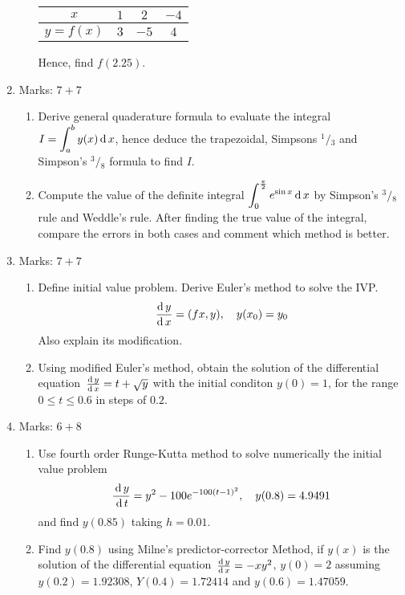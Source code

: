 \documentclass[12pt,class=book,crop=false]{standalone}
\begin{document}
\begin{enumerate}
\begin{enumerate}
\begin{table}[H]
\begin{tabular}{|c|c|c|c|}
                \hline
                $ x $& $ 1 $& $ 2 $& $ -4 $\\\hline               
                $ y=f(x) $ & $ 3 $& $ -5 $& $ 4 $\\\hline
            \end{tabular}
        \end{table}
        Hence, find $ f(2.25) $.
    \end{enumerate}
    \item Marks: $ 7+7 $
    \begin{enumerate}
        \item  Derive general quaderature formula to evaluate the integral $ \displaystyle I=\int_a^b y(x)\,\mathrm{d}\, x $, hence deduce the trapezoidal, Simpsons $ {}^1/{}_3 $ and Simpson's $ {}^3/{}_8 $ formula to find $ I $.
        \item Compute the value of the definite integral $ \displaystyle \int_0^{\frac{\pi}{2}}e^{\sin x}\,\mathrm{d}\, x $ by Simpson's $ {}^3/{}_8 $ rule and Weddle's rule. After finding the true value of the integral, compare the errors in both cases and comment which method is better. 
    \end{enumerate}
    \item Marks: $ 7+7 $
    \begin{enumerate}
        \item Define initial value problem. Derive Euler's method to solve the IVP.
        \[
            \,\frac{\mathrm{d}\,y}{\mathrm{d}\,x}= (fx, y),\quad y(x_0) =y_0
        \]
        Also explain its modification.
        \item Using modified Euler's method, obtain the solution of the differential equation $ \,\frac{\mathrm{d}\,y}{\mathrm{d}\,x}=t+\sqrt{y} $ with the initial conditon $ y (0) = 1 $, for the range $ 0\leq t\leq 0.6 $ in steps of $ 0.2 $.
    \end{enumerate}
    \item Marks: $ 6+8 $
    \begin{enumerate}
        \item Use fourth order Runge-Kutta method to solve numerically the initial value problem
        \[
            \frac{\,\mathrm{d}\, y}{\,\mathrm{d}\, t}=y^2-100e^{-100(t-1)^2},\quad y(0.8)=4.9491
        \]
        and find $ y(0.85) $ taking $ h = 0.01 $.
        \item Find $ y(0.8) $ using Milne's predictor-corrector Method, if $ y(x) $ is the solution of the differential equation $ \,\frac{\mathrm{d}\,y}{\mathrm{d}\,x}=-xy^2 $, $ y(0)=2 $ assuming $ y(0.2) = 1.92308$, $Y(0.4) = 1.72414 $ and $ y(0.6) =1.47059 $.
    \end{enumerate}
\end{enumerate}
\end{document}
